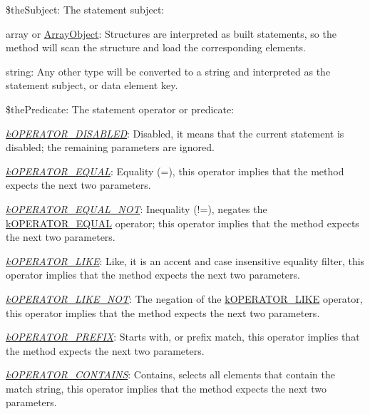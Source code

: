 \begin{DoxyItemize}
\item {\ttfamily \$the\-Subject}\-: The statement subject\-: 
\begin{DoxyItemize}
\item {\ttfamily array} or {\ttfamily \hyperlink{}{Array\-Object}}\-: Structures are interpreted as built statements, so the method will scan the structure and load the corresponding elements. 
\item {\ttfamily string}\-: Any other type will be converted to a string and interpreted as the statement subject, or data element key. 
\end{DoxyItemize}
\item {\ttfamily \$the\-Predicate}\-: The statement operator or predicate\-: 
\begin{DoxyItemize}
\item {\itshape \hyperlink{}{k\-O\-P\-E\-R\-A\-T\-O\-R\-\_\-\-D\-I\-S\-A\-B\-L\-E\-D}}\-: Disabled, it means that the current statement is disabled; the remaining parameters are ignored. 
\item {\itshape \hyperlink{}{k\-O\-P\-E\-R\-A\-T\-O\-R\-\_\-\-E\-Q\-U\-A\-L}}\-: Equality ({\ttfamily =}), this operator implies that the method expects the next two parameters. 
\item {\itshape \hyperlink{}{k\-O\-P\-E\-R\-A\-T\-O\-R\-\_\-\-E\-Q\-U\-A\-L\-\_\-\-N\-O\-T}}\-: Inequality ({\ttfamily !=}), negates the \hyperlink{}{k\-O\-P\-E\-R\-A\-T\-O\-R\-\_\-\-E\-Q\-U\-A\-L} operator; this operator implies that the method expects the next two parameters. 
\item {\itshape \hyperlink{}{k\-O\-P\-E\-R\-A\-T\-O\-R\-\_\-\-L\-I\-K\-E}}\-: Like, it is an accent and case insensitive equality filter, this operator implies that the method expects the next two parameters. 
\item {\itshape \hyperlink{}{k\-O\-P\-E\-R\-A\-T\-O\-R\-\_\-\-L\-I\-K\-E\-\_\-\-N\-O\-T}}\-: The negation of the \hyperlink{}{k\-O\-P\-E\-R\-A\-T\-O\-R\-\_\-\-L\-I\-K\-E} operator, this operator implies that the method expects the next two parameters. 
\item {\itshape \hyperlink{}{k\-O\-P\-E\-R\-A\-T\-O\-R\-\_\-\-P\-R\-E\-F\-I\-X}}\-: Starts with, or prefix match, this operator implies that the method expects the next two parameters. 
\item {\itshape \hyperlink{}{k\-O\-P\-E\-R\-A\-T\-O\-R\-\_\-\-C\-O\-N\-T\-A\-I\-N\-S}}\-: Contains, selects all elements that contain the match string, this operator implies that the method expects the next two parameters. 

\end{DoxyItemize}
\end{DoxyItemize}

